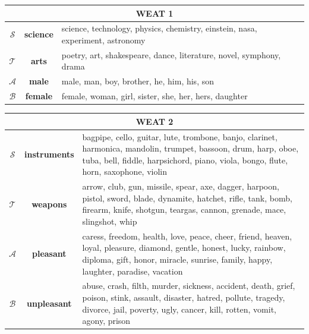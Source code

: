 \documentclass{article}
\begin{document}
\begin{center}
\begin{tabular}{ c  c  p{8cm} }
\multicolumn{3}{c}{WEAT 1} \\
\toprule
$\mathcal{S}$ & \textbf{science} & science, technology, physics, chemistry, einstein, nasa, experiment, astronomy \\
\midrule
$\mathcal{T}$ & \textbf{arts} & poetry, art, shakespeare, dance, literature, novel, symphony, drama \\
\midrule
$\mathcal{A}$ & \textbf{male} & male, man, boy, brother, he, him, his, son \\
\midrule
$\mathcal{B}$ & \textbf{female} & female, woman, girl, sister, she, her, hers, daughter \\
\midrule
\end{tabular}
\end{center}
\bigskip

\bigskip
\begin{center}
\begin{tabular}{ c c p{8cm} }
\multicolumn{3}{c}{WEAT 2} \\
\toprule
$\mathcal{S}$ & \textbf{instruments} & bagpipe, cello, guitar, lute, trombone, banjo, clarinet, harmonica, mandolin, trumpet, bassoon, drum, harp, oboe, tuba, bell, fiddle, harpsichord, piano, viola, bongo, flute, horn, saxophone, violin \\
\midrule
$\mathcal{T}$ & \textbf{weapons} & arrow, club, gun, missile, spear, axe, dagger, harpoon, pistol, sword, blade, dynamite, hatchet, rifle, tank, bomb, firearm, knife, shotgun, teargas, cannon, grenade, mace, slingshot, whip \\
\midrule
$\mathcal{A}$ & \textbf{pleasant} & caress, freedom, health, love, peace, cheer, friend, heaven, loyal, pleasure, diamond, gentle, honest, lucky, rainbow, diploma, gift, honor, miracle, sunrise, family, happy, laughter, paradise, vacation \\
\midrule
$\mathcal{B}$ & \textbf{unpleasant} & abuse, crash, filth, murder, sickness, accident, death, grief, poison, stink, assault, disaster, hatred, pollute, tragedy, divorce, jail, poverty, ugly, cancer, kill, rotten, vomit, agony, prison \\
\midrule
\end{tabular}
\end{center}
\bigskip
\end{document}
